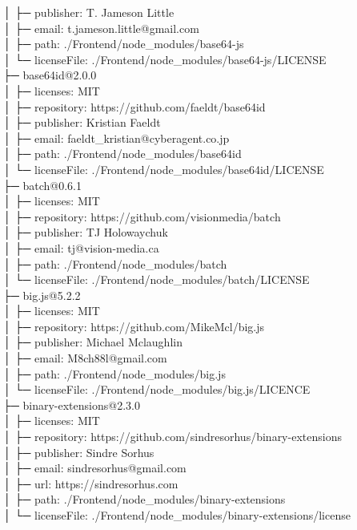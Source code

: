 │  ├─ publisher: T. Jameson Little\\
│  ├─ email: t.jameson.little@gmail.com\\
│  ├─ path: ./Frontend/node\_modules/base64-js\\
│  └─ licenseFile: ./Frontend/node\_modules/base64-js/LICENSE\\
├─ base64id@2.0.0\\
│  ├─ licenses: MIT\\
│  ├─ repository: https://github.com/faeldt/base64id\\
│  ├─ publisher: Kristian Faeldt\\
│  ├─ email: faeldt\_kristian@cyberagent.co.jp\\
│  ├─ path: ./Frontend/node\_modules/base64id\\
│  └─ licenseFile: ./Frontend/node\_modules/base64id/LICENSE\\
├─ batch@0.6.1\\
│  ├─ licenses: MIT\\
│  ├─ repository: https://github.com/visionmedia/batch\\
│  ├─ publisher: TJ Holowaychuk\\
│  ├─ email: tj@vision-media.ca\\
│  ├─ path: ./Frontend/node\_modules/batch\\
│  └─ licenseFile: ./Frontend/node\_modules/batch/LICENSE\\
├─ big.js@5.2.2\\
│  ├─ licenses: MIT\\
│  ├─ repository: https://github.com/MikeMcl/big.js\\
│  ├─ publisher: Michael Mclaughlin\\
│  ├─ email: M8ch88l@gmail.com\\
│  ├─ path: ./Frontend/node\_modules/big.js\\
│  └─ licenseFile: ./Frontend/node\_modules/big.js/LICENCE\\
├─ binary-extensions@2.3.0\\
│  ├─ licenses: MIT\\
│  ├─ repository: https://github.com/sindresorhus/binary-extensions\\
│  ├─ publisher: Sindre Sorhus\\
│  ├─ email: sindresorhus@gmail.com\\
│  ├─ url: https://sindresorhus.com\\
│  ├─ path: ./Frontend/node\_modules/binary-extensions\\
│  └─ licenseFile: ./Frontend/node\_modules/binary-extensions/license\\
